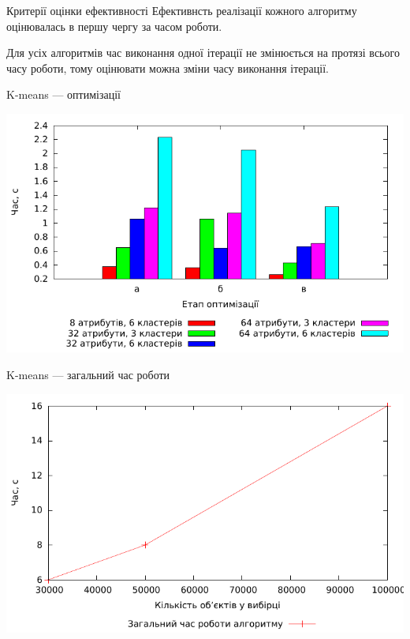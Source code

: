 \documentclass{beamer}
\begin{document}
    
    \begin{frame}{Критерії оцінки ефективності}
        Ефективнсть реалізації кожного алгоритму оцінювалась в першу чергу за часом роботи.
        
        Для усіх алгоритмів час виконання одної ітерації не змінюється на протязі всього часу роботи, тому оцінювати можна зміни часу виконання ітерації.
    \end{frame}
    
    
    \begin{frame}{K-means --- оптимізації}
        \begin{center}
            \includegraphics[scale=0.8]{kmeans_iteration_average.pdf}
            
        \end{center}
    \end{frame}
    
    
    \begin{frame}{K-means --- загальний час роботи}
        \begin{center}
            \includegraphics[scale=0.8]{kmeans_complexity.pdf}
            
        \end{center}
    \end{frame}
    
\end{document}
